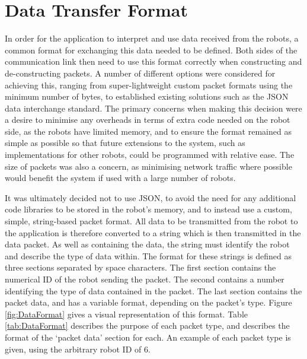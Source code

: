
\section{Data Transfer Format} \label{DataTransferFormat}
In order for the application to interpret and use data received from the robots, a common format for exchanging this data needed to be defined. Both sides of the communication link then need to use this format correctly when constructing and de-constructing packets. A number of different options were considered for achieving this, ranging from super-lightweight custom packet formats using the minimum number of bytes, to established existing solutions such as the JSON data interchange standard. The primary concerns when making this decision were a desire to minimise any overheads in terms of extra code needed on the robot side, as the robots have limited memory, and to ensure the format remained as simple as possible so that future extensions to the system, such as implementations for other robots, could be programmed with relative ease. The size of packets was also a concern, as minimising network traffic where possible would benefit the system if used with a large number of robots.

It was ultimately decided not to use JSON, to avoid the need for any additional code libraries to be stored in the robot's memory, and to instead use a custom, simple, string-based packet format. All data to be transmitted from the robot to the application is therefore converted to a string which is then transmitted in the data packet. As well as containing the data, the string must identify the robot and describe the type of data within. The format for these strings is defined as three sections separated by space characters. The first section contains the numerical ID of the robot sending the packet. The second contains a number identifying the type of data contained in the packet. The last section contains the packet data, and has a variable format, depending on the packet's type. Figure \ref{fig:DataFormat} gives a visual representation of this format. Table \ref{tab:DataFormat} describes the purpose of each packet type, and describes the format of the `packet data' section for each. An example of each packet type is given, using the arbitrary robot ID of 6.

\vspace{2cm}

